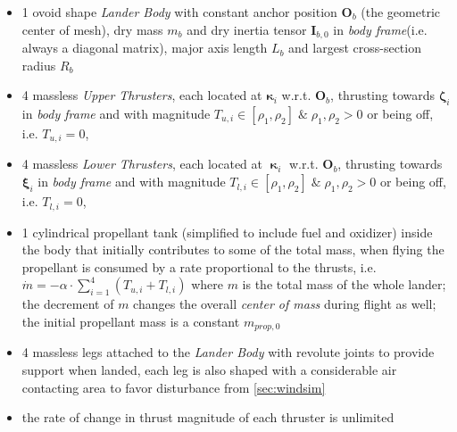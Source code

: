 \documentclass[10pt]{elsarticle}
\begin{document}
\begin{itemize} \label{eqs:hardwareconstraints}
    \item 1 ovoid shape \textit{Lander Body} with constant anchor position $\boldsymbol{O}_b$ (the geometric center of mesh), dry mass $m_b$ and dry inertia tensor $\boldsymbol{I}_{b, 0}$ in \textit{body frame}(i.e. always a diagonal matrix), major axis length $L_b$ and largest cross-section radius $R_b$ 
    \item 4 massless \textit{Upper Thrusters}, each located at $\boldsymbol{ \kappa }_{i}$ w.r.t. $\boldsymbol{O}_b$, thrusting towards $\boldsymbol{\zeta}_{i}$ in \textit{body frame} and with magnitude $T_{u,i} \in [\rho_1, \rho_2] \; \& \; \rho_1, \rho_2 > 0$ or being off, i.e. $T_{u,i} = 0$, 
    \item 4 massless \textit{Lower Thrusters}, each located at $\boldsymbol{ \upkappa } _{i}$ w.r.t. $\boldsymbol{O}_b$, thrusting towards $\boldsymbol{ \xi }_{i}$ in \textit{body frame} and with magnitude $T_{l,i} \in [\rho_1, \rho_2] \; \& \; \rho_1, \rho_2 > 0$ or being off, i.e. $T_{l,i} = 0$, 
    \item 1 cylindrical propellant tank (simplified to include fuel and oxidizer) inside the body that initially contributes to some of the total mass, when flying the propellant is consumed by a rate proportional to the thrusts, i.e. $\dot{m} = -\alpha \cdot \sum\limits_{i=1}^{4}{(T_{u,i} + T_{l,i})}$ where $m$ is the total mass of the whole lander; the decrement of $m$ changes the overall \textit{center of mass} during flight as well; the initial propellant mass is a constant $m_{prop,0}$
    \item 4 massless legs attached to the \textit{Lander Body} with revolute joints to provide support when landed, each leg is also shaped with a considerable air contacting area to favor disturbance from \cref{sec:windsim}    
    \item the rate of change in thrust magnitude of each thruster is unlimited
\end{itemize}
\end{document}
